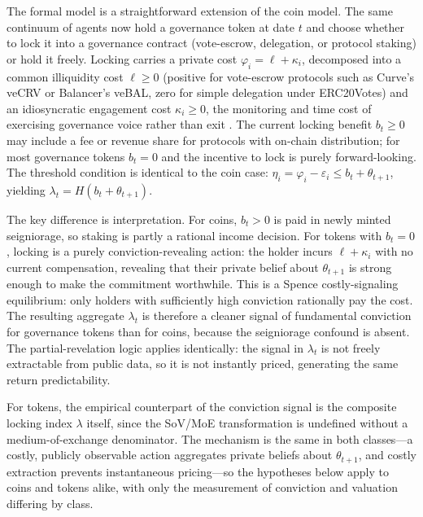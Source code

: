 \documentclass[12pt]{article}
\begin{document}
The formal model is a straightforward extension of the coin model. The same continuum of
agents now hold a governance token at date $t$ and choose whether to lock it into a
governance contract (vote-escrow, delegation, or protocol staking) or hold it freely.
Locking carries a private cost $\varphi_i = \ell + \kappa_i$, decomposed into a
common illiquidity cost $\ell \geq 0$ (positive for vote-escrow protocols such as
Curve's veCRV or Balancer's veBAL, zero for simple delegation under ERC20Votes) and an
idiosyncratic engagement cost $\kappa_i \geq 0$, the monitoring and time cost of
exercising governance voice rather than exit \citep{hirschman1970exit, edmans2011governance}.
The current locking benefit $b_t \geq 0$ may include a fee or revenue share for protocols
with on-chain distribution; for most governance tokens $b_t = 0$ and the incentive to
lock is purely forward-looking. The threshold condition is identical to the coin case:
$\eta_i = \varphi_i - \varepsilon_i \leq b_t + \theta_{t+1}$, yielding
$\lambda_t = H(b_t + \theta_{t+1})$.

The key difference is interpretation. For coins, $b_t > 0$ is paid in newly minted
seigniorage, so staking is partly a rational income decision. For tokens with $b_t = 0$,
locking is a purely conviction-revealing action: the holder incurs $\ell + \kappa_i$ with
no current compensation, revealing that their private belief about $\theta_{t+1}$ is strong
enough to make the commitment worthwhile. This is a Spence \citeyearpar{spence1973job}
costly-signaling equilibrium: only holders with sufficiently high conviction rationally pay
the cost. The resulting aggregate $\lambda_t$ is therefore a cleaner signal of fundamental
conviction for governance tokens than for coins, because the seigniorage confound is
absent. The partial-revelation logic applies identically: the signal in $\lambda_t$ is not
freely extractable from public data, so it is not instantly priced, generating the same
return predictability.

For tokens, the empirical counterpart of the conviction signal is the composite locking
index $\lambda$ itself, since the SoV/MoE transformation is undefined without a
medium-of-exchange denominator. The mechanism is the same in both classes---a costly,
publicly observable action aggregates private beliefs about $\theta_{t+1}$, and costly
extraction prevents instantaneous pricing---so the hypotheses below apply to coins and
tokens alike, with only the measurement of conviction and valuation differing by class.
\end{document}
